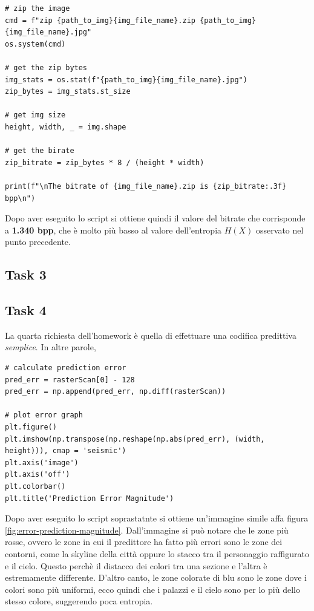 \begin{lstlisting}
# zip the image
cmd = f"zip {path_to_img}{img_file_name}.zip {path_to_img}{img_file_name}.jpg"
os.system(cmd)

# get the zip bytes
img_stats = os.stat(f"{path_to_img}{img_file_name}.jpg")
zip_bytes = img_stats.st_size

# get img size
height, width, _ = img.shape

# get the birate
zip_bitrate = zip_bytes * 8 / (height * width) 

print(f"\nThe bitrate of {img_file_name}.zip is {zip_bitrate:.3f} bpp\n")
\end{lstlisting}

\noindent Dopo aver eseguito lo script si ottiene quindi il valore del bitrate che corrisponde a \textbf{1.340 bpp}, che è molto più basso al valore dell'entropia $H(X)$ osservato nel punto precedente.





\subsection*{Task 3}

\subsection*{Task 4}
La quarta richiesta dell'homework è quella di effettuare una codifica predittiva \textsl{semplice}. In altre parole, 

\begin{lstlisting}
# calculate prediction error
pred_err = rasterScan[0] - 128
pred_err = np.append(pred_err, np.diff(rasterScan))

# plot error graph
plt.figure()
plt.imshow(np.transpose(np.reshape(np.abs(pred_err), (width, height))), cmap = 'seismic')
plt.axis('image')
plt.axis('off')
plt.colorbar()
plt.title('Prediction Error Magnitude')
\end{lstlisting}

\noindent Dopo aver eseguito lo script soprastatnte si ottiene un'immagine simile affa figura \ref{fig:error-prediction-magnitude}. Dall'immagine si può notare che le zone più rosse, ovvero le zone in cui il predittore ha fatto più errori sono le zone dei contorni, come la skyline della città oppure lo stacco tra il personaggio raffigurato e il cielo. Questo perchè il distacco dei colori tra una sezione e l'altra è estremamente differente. D'altro canto, le zone colorate di blu sono le zone dove i colori sono più uniformi, ecco quindi che i palazzi e il cielo sono per lo più dello stesso colore, suggerendo poca entropia. 

